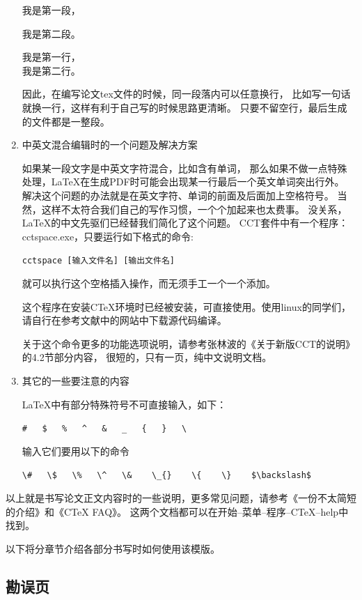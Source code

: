 \begin{enumerate}
\hspace{2em}我是第一段，

\hspace{2em}我是第二段。

\hspace{2em}我是第一行，\\
我是第二行。

\vspace{8pt}

因此，在编写论文tex文件的时候，同一段落内可以任意换行，
比如写一句话就换一行，这样有利于自己写的时候思路更清晰。
只要不留空行，最后生成的文件都是一整段。

\item{中英文混合编辑时的一个问题及解决方案}

如果某一段文字是中英文字符混合，比如含有单词，
那么如果不做一点特殊处理，\LaTeX 在生成PDF时可能会出现某一行最后一个英文单词突出行外。
解决这个问题的办法就是在英文字符、单词的前面及后面加上空格符号。
当然，这样不太符合我们自己的写作习惯，一个个加起来也太费事。
没关系，\LaTeX 的中文先驱们已经替我们简化了这个问题。
CCT套件中有一个程序：cctspace.exe，只要运行如下格式的命令:

\verb+cctspace [输入文件名] [输出文件名]+

就可以执行这个空格插入操作，而无须手工一个一个添加。

这个程序在安装CTeX环境时已经被安装，可直接使用。使用linux的同学们，请自行在参考文献中的网站中下载源代码编译。

关于这个命令更多的功能选项说明，请参考张林波的《关于新版CCT的说明》\cite{NewCCT:2006}的4.2节部分内容，
很短的，只有一页，纯中文说明文档。


\item{其它的一些要注意的内容}

\LaTeX 中有部分特殊符号不可直接输入，如下：

\verb+#   $   %   ^   &   _   {   }   \+

输入它们要用以下的命令

\verb+\#   \$   \%   \^   \&    \_{}    \{    \}    $\backslash$+

\end{enumerate}

以上就是书写论文正文内容时的一些说明，更多常见问题，请参考《一份不太简短的\LaTeXe 介绍》\cite{LaTeXshzh}和《CTeX FAQ》。
这两个文档都可以在开始--菜单--程序--CTeX--help中找到。


以下将分章节介绍各部分书写时如何使用该模版。

\subsection{勘误页}

